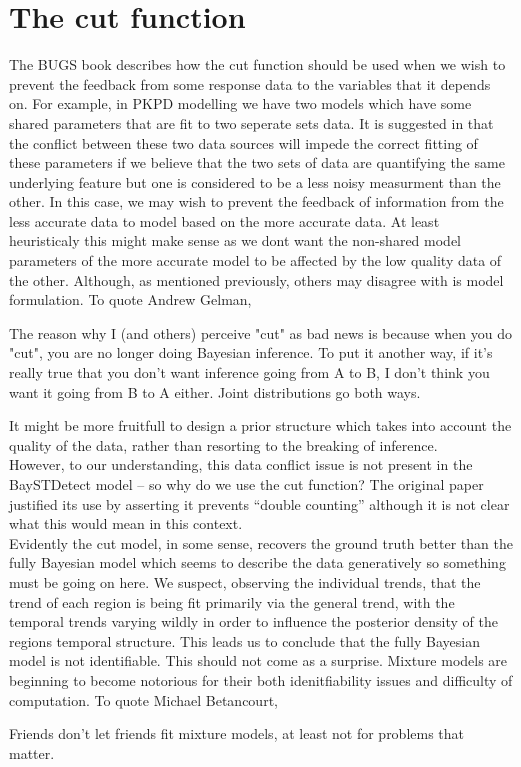 \documentclass[11pt]{report}
\begin{document}
\section{The cut function}

The BUGS book describes how the cut function should be used when we wish to prevent the feedback from some response data to the variables that it depends on. For example, in PKPD modelling we have two models which have some shared parameters that are fit to two seperate sets data. It is suggested in \citet{lunn} that the conflict between these two data sources will impede the correct fitting of these parameters if we believe that the two sets of data are quantifying the same underlying feature but one is considered to be a less noisy measurment than the other. In this case, we may wish to prevent the feedback of information from the less accurate data to model based on the more accurate data. At least heuristicaly this might make sense as we dont want the non-shared model parameters of the more accurate model to be affected by the low quality data of the other. Although, as mentioned previously, others may disagree with is model formulation. To quote Andrew Gelman,
\begin{displayquote}
The reason why I (and others) perceive "cut" as bad news is because when you do "cut",  you are no longer doing Bayesian inference.  To put it another way, if it's really true that you don't want inference going from A to B, I don't think you want it going from B to A either.  Joint distributions go both ways.     
\end{displayquote}
It might be more fruitfull to design a prior structure which takes into account the quality of the data, rather than resorting to the breaking of inference. \\

However, to our understanding, this data conflict issue is not present in the BaySTDetect model -- so why do we use the cut function? The original paper \citep{baystdetect} justified its use by asserting it prevents ``double counting'' although it is not clear what this would mean in this context. \\

Evidently the cut model, in some sense, recovers the ground truth better than the fully Bayesian model which seems to describe the data generatively so something must be going on here. We suspect, observing the individual trends, that the trend of each region is being fit primarily via the general trend, with the temporal trends varying wildly in order to influence the posterior density of the regions temporal structure. This leads us to conclude that the fully Bayesian model is not identifiable. This should not come as a surprise. Mixture models are beginning to become notorious for their both idenitfiability issues and difficulty of computation. To quote Michael Betancourt,
\begin{displayquote}
Friends don't let friends fit mixture models, at least not for problems that matter.
\end{displayquote}
\end{document}
